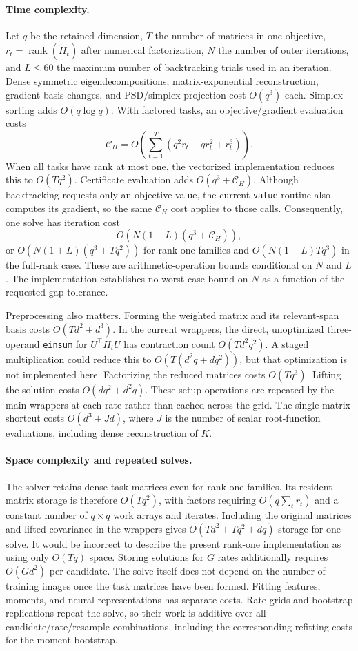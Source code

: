 \paragraph{Time complexity.}
Let $q$ be the retained dimension, $T$ the number of matrices in one objective,
$r_t=\operatorname{rank}(\widetilde H_t)$ after numerical factorization,
$N$ the number of outer iterations, and $L\le60$ the maximum number of
backtracking trials used in an iteration. Dense symmetric eigendecompositions,
matrix-exponential reconstruction, gradient basis changes, and PSD/simplex
projection cost $O(q^3)$ each. Simplex sorting adds $O(q\log q)$.
With factored tasks, an objective/gradient evaluation costs
\[
 \mathcal C_H=
 O\!\left(\sum_{t=1}^T(q^2r_t+qr_t^2+r_t^3)\right).
\]
When all tasks have rank at most one, the vectorized implementation reduces
this to $O(Tq^2)$. Certificate evaluation adds $O(q^3+\mathcal C_H)$.
Although backtracking requests only an objective value, the current
\texttt{value} routine also computes its gradient, so the same
$\mathcal C_H$ cost applies to those calls. Consequently, one solve has
iteration cost
\[
 O\!\left(N(1+L)(q^3+\mathcal C_H)\right),
\]
or $O(N(1+L)(q^3+Tq^2))$ for rank-one families and
$O(N(1+L)Tq^3)$ in the full-rank case. These are arithmetic-operation bounds
conditional on $N$ and $L$. The implementation establishes no worst-case
bound on $N$ as a function of the requested gap tolerance.

Preprocessing also matters. Forming the weighted matrix and its relevant-span
basis costs $O(Td^2+d^3)$. In the current wrappers, the direct, unoptimized
three-operand \texttt{einsum} for $U^\top H_tU$ has contraction count
$O(Td^2q^2)$. A staged multiplication could reduce this to
$O(T(d^2q+dq^2))$, but that optimization is not implemented here.
Factorizing the reduced matrices costs $O(Tq^3)$. Lifting the solution costs
$O(dq^2+d^2q)$. These setup operations are repeated by the main wrappers
at each rate rather than cached across the grid.
The single-matrix shortcut costs $O(d^3+Jd)$, where $J$ is the number of
scalar root-function evaluations, including dense reconstruction of $K$.

\paragraph{Space complexity and repeated solves.}
The solver retains dense task matrices even for rank-one families. Its
resident matrix storage is therefore $O(Tq^2)$, with factors requiring
$O(q\sum_t r_t)$ and a constant number of $q\times q$ work arrays and
iterates. Including the original matrices and lifted covariance in the
wrappers gives $O(Td^2+Tq^2+dq)$ storage for one solve. It would be incorrect
to describe the present rank-one implementation as using only $O(Tq)$
space. Storing solutions for $G$ rates additionally requires $O(Gd^2)$
per candidate. The solve itself does not depend on the number of training
images once the task matrices have been formed. Fitting features, moments,
and neural representations has separate costs. Rate grids and bootstrap
replications repeat the solve, so their work is additive over all
candidate/rate/resample combinations, including the corresponding refitting
costs for the moment bootstrap.
